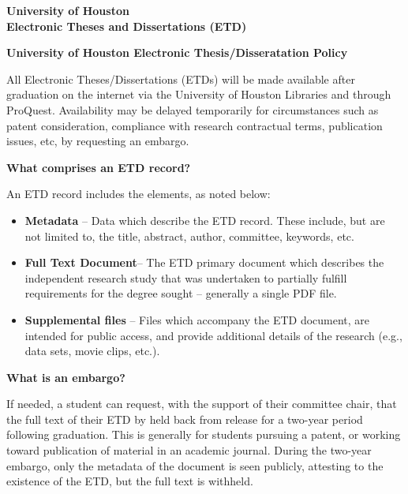 \begin{center}
    \Large\textbf{University of Houston\\
    Electronic Theses and Dissertations (ETD)}
\end{center}

\bigskip

\begin{center}
    \textbf{University of Houston Electronic Thesis/Disseratation Policy}
\end{center}

\noindent All Electronic Theses/Dissertations (ETDs) will be made available after graduation on the internet via the University of Houston Libraries and through ProQuest. Availability may be delayed temporarily for circumstances such as patent consideration, compliance with research contractual terms, publication issues, etc, by requesting an embargo.

\bigskip

\noindent\textbf{What comprises an ETD record?}

\noindent An ETD record includes the elements, as noted below:

\begin{itemize}
    \item \textbf{Metadata} – Data which describe the ETD record. These include, but are not limited to, the title, abstract, author, committee, keywords, etc.
    \item \textbf{Full Text Document}– The ETD primary document which describes the independent research study that was undertaken to partially fulfill requirements for the degree sought – generally a single PDF file.
    \item \textbf{Supplemental files} – Files which accompany the ETD document, are intended for public access, and provide additional details of the research (e.g., data sets, movie clips, etc.).
\end{itemize}

\bigskip

\noindent\textbf{What is an embargo?}

\noindent If needed, a student can request, with the support of their committee chair, that the full text of their ETD by held back from release for a two-year period following graduation. This is generally for students pursuing a patent, or working toward publication of material in an academic journal. During the two-year embargo, only the metadata of the document is seen publicly, attesting to the existence of the ETD, but the full text is withheld.

